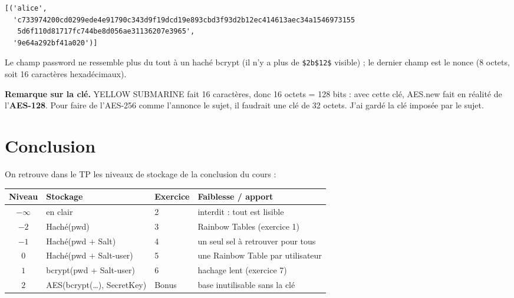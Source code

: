 \documentclass[11pt,a4paper]{article}
\newcommand{\code}[1]{\colorbox{fondcode}{\ttfamily\small #1}}
\begin{document}
\begin{lstlisting}[style=sortie]
[('alice',
  'c733974200cd0299ede4e91790c343d9f19dcd19e893cbd3f93d2b12ec414613aec34a1546973155
   5d6f110d81717fc744be8d056ae31136207e3965',
  '9e64a292bf41a020')]
\end{lstlisting}

Le champ \code{password} ne ressemble plus du tout à un haché bcrypt (il n'y a plus de \texttt{\$2b\$12\$} visible) ; le dernier champ est le nonce (8 octets, soit 16 caractères hexadécimaux).

\textbf{Remarque sur la clé.} \code{YELLOW SUBMARINE} fait 16 caractères, donc 16 octets = 128 bits : avec cette clé, \code{AES.new} fait en réalité de l'\textbf{AES-128}. Pour faire de l'AES-256 comme l'annonce le sujet, il faudrait une clé de 32 octets. J'ai gardé la clé imposée par le sujet.

\section*{Conclusion}

On retrouve dans le TP les niveaux de stockage de la conclusion du cours :

\begin{center}
\begin{tabular}{c l l l}
\toprule
\textbf{Niveau} & \textbf{Stockage} & \textbf{Exercice} & \textbf{Faiblesse / apport} \\
\midrule
$-\infty$ & en clair & 2 & interdit : tout est lisible \\
$-2$ & Haché(pwd) & 3 & Rainbow Tables (exercice 1) \\
$-1$ & Haché(pwd + Salt) & 4 & un seul sel à retrouver pour tous \\
$0$ & Haché(pwd + Salt-user) & 5 & une Rainbow Table par utilisateur \\
$1$ & bcrypt(pwd + Salt-user) & 6 & hachage lent (exercice 7) \\
$2$ & AES(bcrypt(\dots), SecretKey) & Bonus & base inutilisable sans la clé \\
\bottomrule
\end{tabular}
\end{center}
\end{document}
